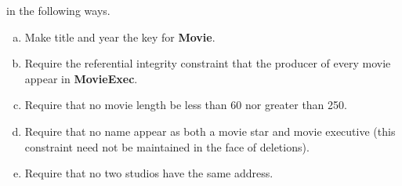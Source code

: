 \documentclass[12pt]{article}
\begin{document}
\begin{enumerate}[1.]
    \bigskip

    in the following ways.

    \bigskip

    \begin{enumerate}[a)]
        \item Make title and year the key for \textbf{Movie}.
        \item Require the referential integrity constraint that the producer of every movie appear in \textbf{MovieExec}.
        \item Require that no movie length be less than 60 nor greater than 250.
        \item Require that no name appear as both a movie star and movie executive (this constraint need not be maintained in the face of deletions).
        \item Require that no two studios have the same address.
    \end{enumerate}

\end{enumerate}
\end{document}
